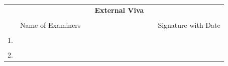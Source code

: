 \begin{table}[H]
\centering
{}
\end{table}

\begin{table}[H]
\centering
\begin{tabular}{lccp{6cm}cc}
&&&\textbf{External Viva}&&\\
&&&&&\\
&Name of Examiners &&& & Signature with Date\\
&&&&&\\
1.&&&&&\\
&&&&&\\
2.&&&&&\\
\end{tabular}%
\end{table}
